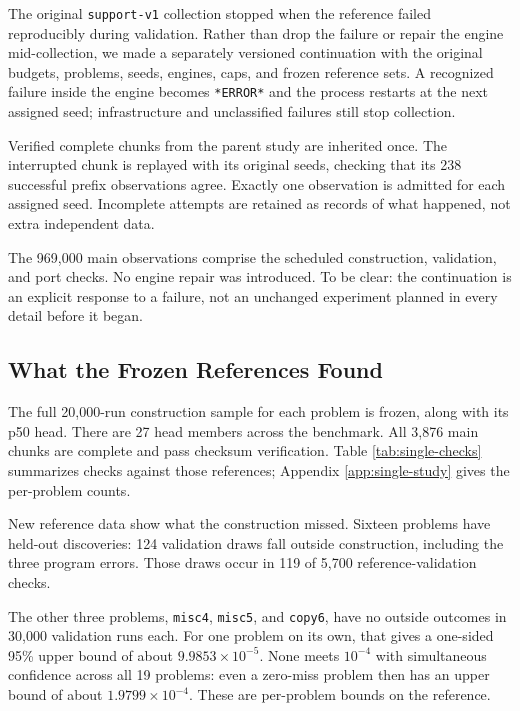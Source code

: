 \documentclass[10pt,letterpaper]{article}
\begin{document}
The original \texttt{support-v1} collection stopped when the reference failed reproducibly
during validation. Rather than drop the failure or repair the engine mid-collection, we
made a separately versioned continuation with the original budgets, problems, seeds,
engines, caps, and frozen reference sets. A recognized failure inside the engine becomes
\texttt{*ERROR*} and the process restarts at the next assigned seed; infrastructure and
unclassified failures still stop collection.

Verified complete chunks from the parent study are inherited once. The interrupted chunk
is replayed with its original seeds, checking that its 238 successful prefix observations
agree. Exactly one observation is admitted for each assigned seed. Incomplete attempts are
retained as records of what happened, not extra independent data.

The 969,000 main observations comprise the scheduled construction, validation, and port
checks. No engine repair was introduced. To be clear: the continuation is an explicit
response to a failure, not an unchanged experiment planned in every detail before it
began.

\subsection{What the Frozen References Found}\label{sec:single-results}

The full 20,000-run construction sample for each problem is frozen, along with its p50
head. There are 27 head members across the benchmark. All 3,876 main chunks are complete
and pass checksum verification. Table \ref{tab:single-checks} summarizes checks against
those references; Appendix \ref{app:single-study} gives the per-problem counts.



New reference data show what the construction missed. Sixteen problems have held-out
discoveries: 124 validation draws fall outside construction, including the three program
errors. Those draws occur in 119 of 5,700 reference-validation checks.

The other three problems, \texttt{misc4}, \texttt{misc5}, and \texttt{copy6}, have no
outside outcomes in 30,000 validation runs each. For one problem on its own, that gives a
one-sided 95\% upper bound of about \(9.9853\times10^{-5}\). None meets \(10^{-4}\) with
simultaneous confidence across all 19 problems: even a zero-miss problem then has an upper
bound of about \(1.9799\times10^{-4}\). These are per-problem bounds on the reference.
\end{document}

